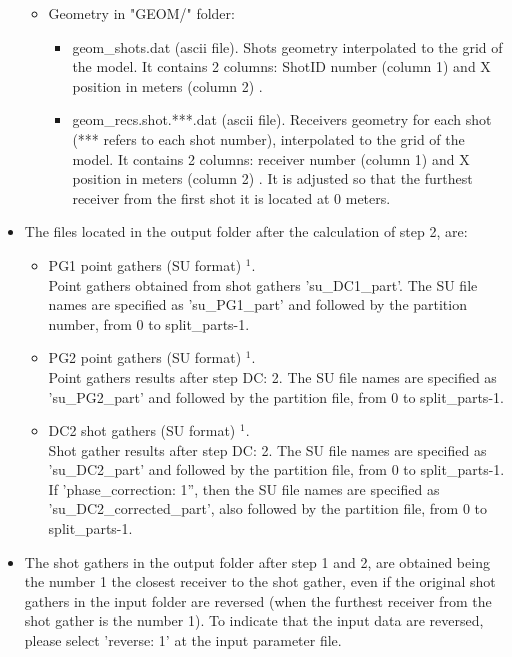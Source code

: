 \documentclass[11pt, oneside]{article}   	%
\begin{document}
\begin{itemize}
\begin{itemize}
 \item Geometry in "GEOM/" folder:
  \begin{itemize}
  \item  geom\_shots.dat (ascii file). Shots geometry interpolated to the grid of the model. It contains 2 columns: ShotID number (column 1) and X position in meters (column 2) .
  \item  geom\_recs.shot.***.dat (ascii file). Receivers geometry for each shot (*** refers to each shot number), interpolated to the grid of the model. It contains 2 columns: receiver number (column 1) and X position in meters (column 2) . It is adjusted so that the furthest receiver from the first shot it is located at 0 meters.
   \end{itemize}
 
\end{itemize}

\item The files located in the output folder after the calculation of step 2, are:

\begin{itemize}
 
 \item PG1 point gathers (SU format) $^{1}$.\\
 Point gathers obtained from shot gathers 'su\_DC1\_part'. The SU file names are specified as 'su\_PG1\_part' and followed by the partition number, from 0 to split\_parts-1.
 
 \item PG2 point gathers (SU format) $^{1}$.\\
 Point gathers results after step DC: 2. The SU file names are specified as 'su\_PG2\_part' and followed by the partition file, from 0 to split\_parts-1.
 
  \item DC2 shot gathers (SU format) $^{1}$.\\
Shot gather results after step DC: 2. The SU file names are specified as 'su\_DC2\_part' and followed by the partition file, from 0 to split\_parts-1. If 'phase\_correction: 1'', then the SU file names are specified as 'su\_DC2\_corrected\_part', also followed by the partition file, from 0 to split\_parts-1.

\end{itemize}

\item The shot gathers in the output folder after step 1 and 2, are obtained being the number 1 the closest receiver to the shot gather, even if the original shot gathers in the input folder are reversed (when the furthest receiver from the shot gather is the number 1). To indicate that the input data are reversed, please select 'reverse: 1' at the input parameter file.

\end{itemize}
\end{document}
